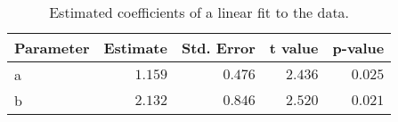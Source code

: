 \begin{table}[!tbp]
\caption{Estimated coefficients of a linear fit to the data.\label{tab:coefs}} 
\begin{center}
\begin{tabular}{lrrrr}
\hline\hline
\multicolumn{1}{l}{Parameter}&\multicolumn{1}{c}{Estimate}&\multicolumn{1}{c}{Std. Error}&\multicolumn{1}{c}{t value}&\multicolumn{1}{c}{p-value}\tabularnewline
\hline
a&$1.159$&$0.476$&$2.436$&$0.025$\tabularnewline
b&$2.132$&$0.846$&$2.520$&$0.021$\tabularnewline
\hline
\end{tabular}\end{center}
\end{table}
